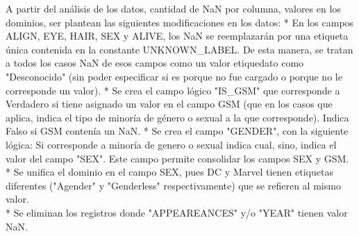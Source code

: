 \documentclass[11pt]{article}
\begin{document}
    A partir del análisis de los datos, cantidad de NaN por columna, valores
en los dominios, ser plantean las siguientes modificaciones en los
datos: * En los campos ALIGN, EYE, HAIR, SEX y ALIVE, los NaN se
reemplazarán por una etiqueta única contenida en la constante
UNKNOWN\_LABEL. De esta manera, se tratan a todos los casos NaN de esos
campos como un valor etiquedato como "Desconocido" (sin poder
especificar si es porque no fue cargado o porque no le corresponde un
valor). * Se crea el campo lógico "IS\_GSM" que corresponde a Verdadero
si tiene asignado un valor en el campo GSM (que en los casos que aplica,
indica el tipo de minoría de género o sexual a la que corresponde).
Indica Falso si GSM contenía un NaN. * Se crea el campo "GENDER", con la
siguiente lógica: Si corresponde a minoría de genero o sexual indica
cual, sino, indica el valor del campo "SEX". Este campo permite
consolidar los campos SEX y GSM. * Se unifica el dominio en el campo
SEX, pues DC y Marvel tienen etiquetas diferentes ("Agender" y
"Genderless" respectivamente) que se refieren al mismo valor.\\
* Se eliminan los registros donde "APPEAREANCES" y/o "YEAR" tienen valor
NaN.
\end{document}
